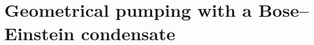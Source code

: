 
\appendix
\renewcommand{\thechapter}{B}
\renewcommand{\chaptername}{Appendix}

\chapter{Geometrical pumping with a Bose--Einstein condensate}

